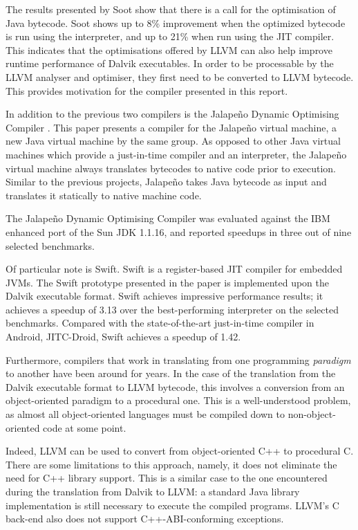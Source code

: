 The results presented by Soot show that there is a call for the optimisation of Java bytecode. Soot shows up to 8\% improvement when the optimized bytecode is run using the interpreter, and up to 21\% when run using the JIT compiler. This indicates that the optimisations offered by LLVM can also help improve runtime performance of Dalvik executables. In order to be processable by the LLVM analyser and optimiser, they first need to be converted to LLVM bytecode. This provides motivation for the compiler presented in this report.


In addition to the previous two compilers is the Jalape\~{n}o Dynamic Optimising Compiler \cite{Burke:1999:JDO:304065.304113}. This paper presents a compiler for the Jalape\~{n}o virtual machine, a new Java virtual machine by the same group. As opposed to other Java virtual machines which provide a just-in-time compiler and an interpreter, the Jalape\~{n}o virtual machine always translates bytecodes to native code prior to execution. Similar to the previous projects, Jalape\~{n}o takes Java bytecode as input and translates it statically to native machine code.

The Jalape\~{n}o Dynamic Optimising Compiler was evaluated against the IBM enhanced port of the Sun JDK 1.1.16, and reported speedups in three out of nine selected benchmarks.


Of particular note is Swift\cite{Zhang:2012:SRJ:2151024.2151035}. Swift is a register-based JIT compiler for embedded JVMs. The Swift prototype presented in the paper is implemented upon the Dalvik executable format. Swift achieves impressive performance results; it achieves a speedup of 3.13 over the best-performing interpreter on the selected benchmarks. Compared with the state-of-the-art just-in-time compiler in Android, JITC-Droid, Swift achieves a speedup of 1.42.

Furthermore, compilers that work in translating from one programming \emph{paradigm} to another have been around for years. In the case of the translation from the Dalvik executable format to LLVM bytecode, this involves a conversion from an object-oriented paradigm to a procedural one. This is a well-understood problem, as almost all object-oriented languages must be compiled down to non-object-oriented code at some point.

Indeed, LLVM can be used to convert from object-oriented C++ to procedural C\footnotemark {}. There are some limitations to this approach, namely, it does not eliminate the need for C++ library support. This is a similar case to the one encountered during the translation from Dalvik to LLVM: a standard Java library implementation is still necessary to execute the compiled programs. LLVM's C back-end also does not support C++-ABI-conforming exceptions.

